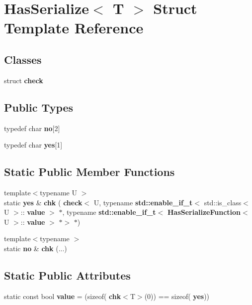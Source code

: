 \section{Has\+Serialize$<$ T $>$ Struct Template Reference}
\label{structmlpack_1_1data_1_1HasSerialize}
\subsection*{Classes}
\begin{DoxyCompactItemize}
\item 
struct \textbf{ check}
\end{DoxyCompactItemize}
\subsection*{Public Types}
\begin{DoxyCompactItemize}
\item 
typedef char \textbf{ no}[2]
\item 
typedef char \textbf{ yes}[1]
\end{DoxyCompactItemize}
\subsection*{Static Public Member Functions}
\begin{DoxyCompactItemize}
\item 
{\footnotesize template$<$typename U $>$ }\\static \textbf{ yes} \& \textbf{ chk} (\textbf{ check}$<$ U, typename \textbf{ std\+::enable\+\_\+if\+\_\+t}$<$ std\+::is\+\_\+class$<$ U $>$\+::\textbf{ value} $>$ $\ast$, typename \textbf{ std\+::enable\+\_\+if\+\_\+t}$<$ \textbf{ Has\+Serialize\+Function}$<$ U $>$\+::\textbf{ value} $>$ $\ast$$>$ $\ast$)
\item 
{\footnotesize template$<$typename $>$ }\\static \textbf{ no} \& \textbf{ chk} (...)
\end{DoxyCompactItemize}
\subsection*{Static Public Attributes}
\begin{DoxyCompactItemize}
\item 
static const bool \textbf{ value} = (sizeof(\textbf{ chk}$<$T$>$(0)) == sizeof(\textbf{ yes}))
\end{DoxyCompactItemize}


